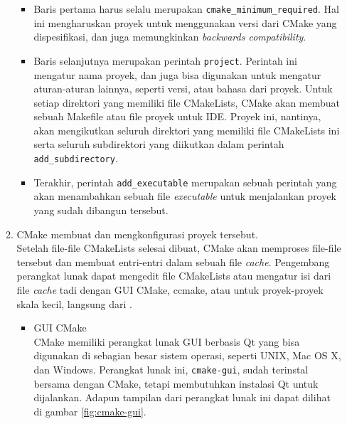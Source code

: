 \documentclass[a4paper,twoside]{article}
\begin{document}
\begin{enumerate}
\begin{enumerate}
	\begin{itemize}
		\item Baris pertama harus selalu merupakan \verb|cmake_minimum_required|. Hal ini mengharuskan proyek untuk menggunakan versi dari CMake yang dispesifikasi, dan juga memungkinkan \textit{backwards compatibility}.
		\item Baris selanjutnya merupakan perintah \verb|project|. Perintah ini mengatur nama proyek, dan juga bisa digunakan untuk mengatur aturan-aturan lainnya, seperti versi, atau bahasa dari proyek.
		Untuk setiap direktori yang memiliki file CMakeLists, CMake akan membuat sebuah Makefile atau file proyek untuk IDE. Proyek ini, nantinya, akan mengikutkan seluruh direktori yang memiliki file CMakeLists ini serta seluruh subdirektori yang diikutkan dalam perintah \verb|add_subdirectory|.
		\item Terakhir, perintah \verb|add_executable| merupakan sebuah perintah yang akan menambahkan sebuah file \textit{executable} untuk menjalankan proyek yang sudah dibangun tersebut.
	\end{itemize}
	\item CMake membuat dan mengkonfigurasi proyek tersebut.\\
	Setelah file-file CMakeLists selesai dibuat, CMake akan memproses file-file tersebut dan membuat entri-entri dalam sebuah file \textit{cache}. Pengembang perangkat lunak dapat mengedit file CMakeLists atau mengatur isi dari file \textit{cache} tadi dengan GUI CMake, ccmake, atau untuk proyek-proyek skala kecil, langsung dari \cl.
	
	\begin{itemize}
		\item GUI CMake\\
		CMake memiliki perangkat lunak GUI berbasis Qt yang bisa digunakan di sebagian besar sistem operasi, seperti UNIX, Mac OS X, dan Windows. Perangkat lunak ini, \verb|cmake-gui|, sudah terinstal bersama dengan CMake, tetapi membutuhkan instalasi Qt untuk dijalankan. Adapun tampilan dari perangkat lunak ini dapat dilihat di gambar \ref{fig:cmake-gui}.
		

\end{itemize}
\end{enumerate}
\end{enumerate}
\end{document}
